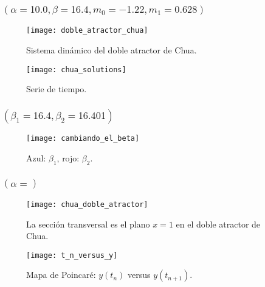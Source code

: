 
\begin{frame}
	\frametitle{\secname\quad$\left(\alpha=10.0, \beta=16.4, m_{0}=-1.22, m_{1}=0.628\right)$}

	\begin{minipage}{0.45\textwidth}
		\begin{figure}[ht!]
			\centering
			\texttt{[image: doble\_atractor\_chua]}
			\caption{Sistema dinámico del doble atractor de Chua.}\label{fig:doble_atractor_chua}
		\end{figure}
	\end{minipage}
	\begin{minipage}{0.45\textwidth}
		\begin{figure}[ht!]
			\centering
			\texttt{[image: chua\_solutions]}
			\caption{Serie de tiempo.}\label{fig:chua_solutions}
		\end{figure}
	\end{minipage}
\end{frame}


\begin{frame}
	\frametitle{\secname\quad$\left(\beta_{1}=16.4,\beta_{2}=16.401\right)$}

	\begin{figure}[ht!]
		\centering
		\texttt{[image: cambiando\_el\_beta]}
		\caption{Azul: $\beta_{1}$, rojo: $\beta_{2}$.}\label{fig:lyapunov}
	\end{figure}

\end{frame}

\begin{frame}
	\frametitle{\secname\quad$\left(\alpha=\right)$}

	\begin{minipage}{0.45\textwidth}
		\begin{figure}[ht!]
			\centering
			\texttt{[image: chua\_doble\_atractor]}
			\caption{La sección transversal es el plano $x=1$ en el doble atractor de Chua.}\label{fig:chua_doble_atractor}
		\end{figure}
	\end{minipage}
	\begin{minipage}{0.45\textwidth}
		\begin{figure}[ht!]
			\centering
			\texttt{[image: t\_n\_versus\_y]}
			\caption{Mapa de Poincaré: $y\left(t_{n}\right)$ versus $y\left(t_{n+1}\right)$.}\label{fig:chua_solutions}
		\end{figure}
	\end{minipage}
\end{frame}

